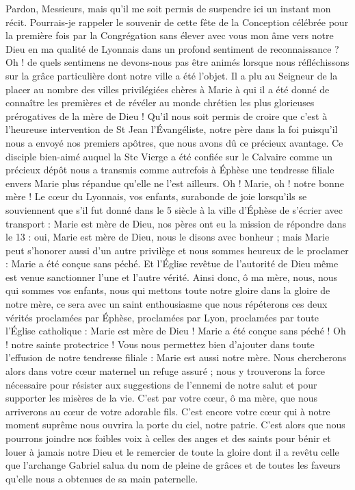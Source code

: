 Pardon, Messieurs, mais qu'il me soit permis de suspendre ici un instant mon récit. Pourrais-je rappeler le souvenir de cette fête de la Conception célébrée pour la première fois par la Congrégation sans élever avec vous mon âme vers notre Dieu en ma qualité de Lyonnais dans un profond sentiment de reconnaissance ? Oh ! de quels sentimens ne devons-nous pas être animés lorsque nous réfléchissons sur la grâce particulière dont notre ville a été l'objet. Il a plu au Seigneur de la placer au nombre des villes privilégiées chères à Marie à qui il a été donné de connaître les premières et de révéler au monde chrétien les plus glorieuses prérogatives de la mère de Dieu ! Qu'il nous soit permis de croire que c'est à l'heureuse intervention de St Jean l'Évangéliste, notre père dans la foi puisqu'il nous a envoyé nos premiers apôtres, que nous avons dû ce précieux avantage. Ce disciple bien-aimé auquel la Ste
Vierge a été confiée sur le Calvaire comme un précieux dépôt nous a transmis comme autrefois à Éphèse une tendresse filiale envers Marie plus répandue qu'elle ne l'est ailleurs. Oh ! Marie, oh ! notre bonne mère ! Le cœur du Lyonnais, vos enfants, surabonde de joie lorsqu'ils se souviennent que s'il fut donné dans le 5 siècle à la ville d'Éphèse de s'écrier avec transport : Marie est mère de Dieu, nos pères ont eu la mission de répondre dans le 13 : oui, Marie est mère de Dieu, nous le disons avec bonheur ; mais Marie peut s'honorer aussi d'un autre privilège et nous sommes heureux de le proclamer : Marie a été conçue sans péché. Et l'Église revêtue de l'autorité de Dieu même est venue sanctionner l'une et l'autre vérité. Ainsi donc, ô ma mère, nous, nous qui sommes vos enfants, nous qui mettons toute notre gloire dans la gloire de notre mère, ce sera avec un saint enthousiasme que nous répéterons ces deux vérités proclamées par Éphèse, proclamées par Lyon, proclamées par toute l'Église catholique : Marie est mère de Dieu ! Marie a été conçue sans péché ! Oh ! notre sainte protectrice ! Vous nous permettez bien d'ajouter dans toute l'effusion de notre tendresse filiale : Marie est aussi notre mère. Nous chercherons alors dans votre cœur maternel un refuge assuré ; nous y trouverons la force nécessaire pour résister aux suggestions de l'ennemi de notre salut et pour supporter les misères de la vie. C'est par votre cœur, ô ma mère, que nous arriverons au cœur de votre adorable fils. C'est encore votre cœur qui à notre moment suprême nous ouvrira la porte du ciel, notre patrie. C'est alors que nous pourrons joindre nos foibles voix à celles des anges et des saints
pour bénir et louer à jamais notre Dieu et le remercier de toute la gloire dont il a revêtu celle que l'archange Gabriel salua du nom de pleine de grâces et de toutes les faveurs qu'elle nous a obtenues de sa main paternelle.

